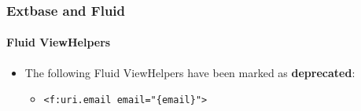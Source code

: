 %

\begin{frame}[fragile]
	\frametitle{Extbase and Fluid}
	\framesubtitle{Fluid ViewHelpers}


	\begin{itemize}
		\item The following Fluid ViewHelpers have been marked as \textbf{deprecated}:

			\begin{itemize}\small
				\item \texttt{<f:uri.email email="\{email\}">}
			\end{itemize}\normalsize

	\end{itemize}

\end{frame}

